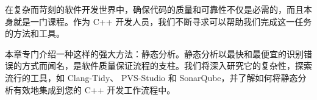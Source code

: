在复杂而苛刻的软件开发世界中，确保代码的质量和可靠性不仅是必需的，而且本身就是一门课程。作为 C++ 开发人员，我们不断寻求可以帮助我们完成这一任务的方法和工具。

本章专门介绍一种这样的强大方法：静态分析。静态分析以最快和最便宜的识别错误的方式而闻名，是软件质量保证流程的支柱。我们将深入研究它的复杂性，探索流行的工具，如 Clang-Tidy、 PVS-Studio 和 SonarQube，并了解如何将静态分析有效地集成到您的 C++ 开发工作流程中。
